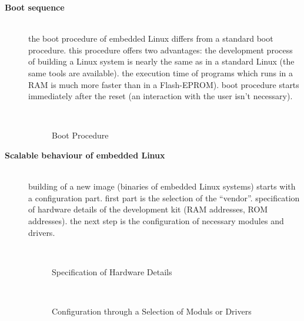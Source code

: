 \begin{description}
\item[{\rot\bf Boot sequence}]~\\[-3ex]
\bigskip
\bi
	\ite the boot procedure of embedded Linux differs from a standard boot procedure.
	\ite this procedure offers two advantages:
	\bi
		\ite the development process of building a Linux system is nearly the same as in a standard Linux (the same tools are available).
		\ite the execution time of programs which runs in a RAM is much more faster than in a Flash-EPROM).
	\ei
	\bigskip
	\ite boot procedure starts immediately after the reset (an interaction with the user isn't necessary).
\ei
\os{\newpage}
\begin{figure}[!hbtp]
     \begin{center}
	  \\
	  \caption{Boot Procedure}
     \end{center}
\end{figure}
\os{\newpage}

\item[{\rot\bf Scalable behaviour of embedded Linux}]~\\[-3ex]
\bi
	\ite building of a new image (binaries of embedded Linux systems) starts with a configuration part.
	\ite first part is the selection of the ``vendor''.
	\ite specification of hardware details of the development kit (RAM addresses, ROM addresses).
	\ite the next step is the configuration of necessary modules and drivers.

\ei

\os{\newpage}
\begin{figure}[!hbtp]
     \begin{center}
	  \\
	  \caption{Specification of Hardware Details}
     \end{center}
\end{figure}
\os{\newpage}
\begin{figure}[!hbtp]
     \begin{center}
	  \\
	  \caption{Configuration through a Selection of Moduls or Drivers}
     \end{center}
\end{figure}
\os{\newpage}


\end{description}
